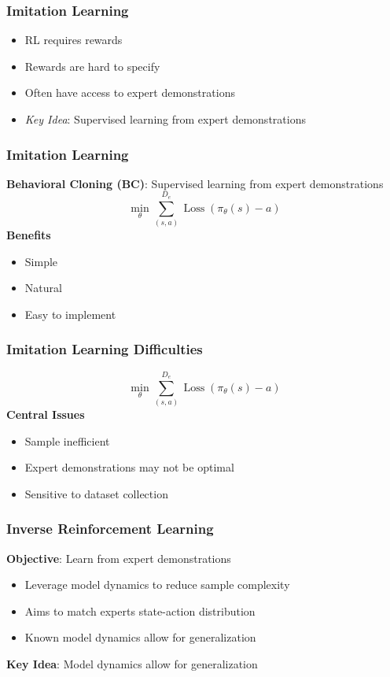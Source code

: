 \documentclass{beamer}
\DeclareMathOperator{\loss}{Loss}
\begin{document}
\begin{frame}
\frametitle{Imitation Learning}
	\begin{itemize}
		\item RL requires rewards
		\vfill
		\item Rewards are hard to specify
		\vfill
		\item Often have access to expert demonstrations
		\vfill
		\item \emph{Key Idea}: Supervised learning from expert demonstrations
	\end{itemize}
\end{frame}

\begin{frame}
\frametitle{Imitation Learning}
	\textbf{Behavioral Cloning (BC)}: Supervised learning from expert demonstrations
	\[ 
		\min_{\theta} \sum_{(s,a)}^{D_e} \loss \left(\pi_\theta(s) - a \right)
	\]
	\vfill
	\textbf{Benefits}
	\begin{itemize}
		\item Simple
		\item Natural
		\item Easy to implement
	\end{itemize}
\end{frame}

\begin{frame}
	\frametitle{Imitation Learning Difficulties}
	\[ 
		\min_{\theta} \sum_{(s,a)}^{D_e} \loss \left(\pi_\theta(s) - a \right)
	\]
	\vfill
	\textbf{Central Issues}
	\begin{itemize}
		\item Sample inefficient
		\item Expert demonstrations may not be optimal
		\item Sensitive to dataset collection
	\end{itemize}
\end{frame}

\begin{frame}
	\frametitle{Inverse Reinforcement Learning}
	\textbf{Objective}: Learn from expert demonstrations
	\begin{itemize}
		\item Leverage model dynamics to reduce sample complexity
		\item Aims to match experts state-action distribution
		\item Known model dynamics allow for generalization
	\end{itemize}
	\vfill
	\textbf{Key Idea}: Model dynamics allow for generalization
\end{frame}
\end{document}
